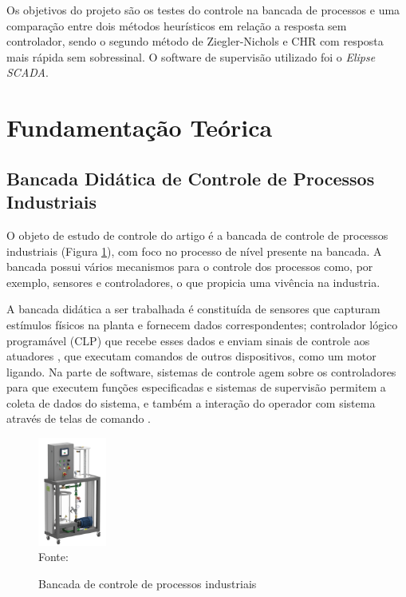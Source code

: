\documentclass[conference]{IEEEtran}
\begin{document}
Os objetivos do projeto são os testes do controle na bancada de processos e uma comparação entre dois métodos heurísticos em relação a resposta sem controlador, sendo o segundo método de Ziegler-Nichols e CHR com resposta mais rápida sem sobressinal. O software de supervisão utilizado foi o \textit{Elipse SCADA}.

\section{Fundamentação Teórica}

\subsection{Bancada Didática de Controle de Processos Industriais}

O objeto de estudo de controle do artigo é a bancada de controle de processos industriais (Figura \ref{figura:bancada}), com foco no processo de nível presente na bancada. A bancada possui vários mecanismos  para o controle dos processos como, por exemplo, sensores e controladores, o que propicia uma vivência na industria.

A bancada didática a ser trabalhada é constituída de sensores que capturam estímulos físicos na planta e fornecem dados correspondentes;  controlador lógico programável (CLP) que recebe esses dados e enviam sinais de controle aos atuadores , que executam comandos de outros dispositivos, como um motor ligando. Na parte de software, sistemas de controle agem sobre os controladores para que executem funções especificadas e sistemas de supervisão permitem a coleta de dados do sistema, e também a interação do operador com sistema através de telas de comando \cite{auttom}.

\begin{figure}[!http]
    \centering
    \caption{Bancada de controle de processos industriais}
    \includegraphics[width=0.2\textwidth]{imagens/Bancada.png}\\
    Fonte: \cite{auttom}
    \label{figura:bancada}
\end{figure}
\end{document}
